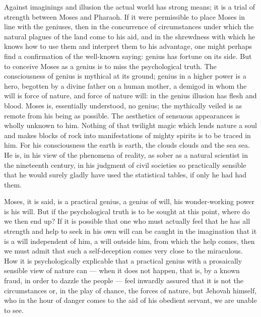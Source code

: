 \documentclass[12pt,a4paper,openany]{book}
\newcommand{\opage}[1]{\marginnote{\footnotesize\textit{[#1]}}}
\begin{document}
Against imaginings and illusion the actual
world has strong means; it is a trial of strength
between Moses and Pharaoh. If it were permissible to place Moses
in line with the geniuses, then in the concurrence
of circumstances under which the natural plagues of the land
come to his aid, and in the shrewdness with which
he knows how to use them and interpret them to his advantage,
one might perhaps find a confirmation of the well-known saying:
genius has fortune on its side. But to conceive Moses as a
genius is to miss the psychological truth. The consciousness of
genius is mythical at its ground; genius in a higher
power is a hero, begotten by a divine father
on a human mother, a demigod in whom the will
is force of nature, and force of nature will: in the genius illusion has
flesh and blood. Moses is, essentially understood,
no genius; the mythically veiled is as remote from his being
as possible. The aesthetics of sensuous appearances
is wholly unknown to him. Nothing of that twilight magic
which lends nature a soul and makes blocks of rock
into manifestations of mighty spirits is to be traced
in him. For his consciousness the earth is earth, the clouds
clouds and the sea sea. He is, in his view of
the phenomena of reality, as sober as a natural scientist
in the nineteenth century, in his judgment
of civil societies so practically sensible that
he would surely gladly have used the statistical tables,
if only he had had them.

Moses, it is said, is a practical genius, a genius of will,
his wonder-working power is his will. But if
the psychological truth is to be sought at this point,
\setcounter{footnote}{0}%
\opage{27}where do we then end up? If it is possible that one
who must actually feel that he has all strength and help
to seek in his own will can be caught in the imagination
that it is a will independent of him, a will
outside him, from which the help comes, then we must
admit that such a self-deception comes very close
to the miraculous. How it is psychologically explicable
that a practical genius with a prosaically sensible
view of nature can --- when it does not happen, that is, by
a known fraud, in order to dazzle the people --- feel
inwardly assured that it is not the circumstances
or, in the play of chance, the forces of nature, but Jehovah himself,
who in the hour of danger comes to the aid of his obedient servant,
we are unable to see.
\end{document}
